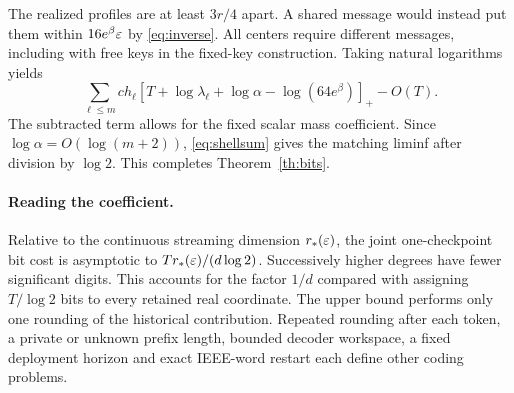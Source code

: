 The realized profiles are at least $3r/4$ apart. A shared message would instead put them within $16 e^\beta\varepsilon$ by \eqref{eq:inverse}. All centers require different messages, including with free keys in the fixed-key construction. Taking natural logarithms yields
\[
 \sum_{\ell\le m}c h_\ell[T+\log\lambda_\ell+\log\alpha-\log(64e^\beta)]_+-O(T).
\]
The subtracted term allows for the fixed scalar mass coefficient. Since $\log\alpha=O(\log(m+2))$, \eqref{eq:shellsum} gives the matching liminf after division by $\log 2$. This completes Theorem~\ref{th:bits}.

\paragraph{Reading the coefficient.}
Relative to the continuous streaming dimension $r_*(\varepsilon)$, the joint one-checkpoint bit cost is asymptotic to $T r_*(\varepsilon)/(d\log2)$. Successively higher degrees have fewer significant digits. This accounts for the factor $1/d$ compared with assigning $T/\log 2$ bits to every retained real coordinate. The upper bound performs only one rounding of the historical contribution. Repeated rounding after each token, a private or unknown prefix length, bounded decoder workspace, a fixed deployment horizon and exact IEEE-word restart each define other coding problems.

